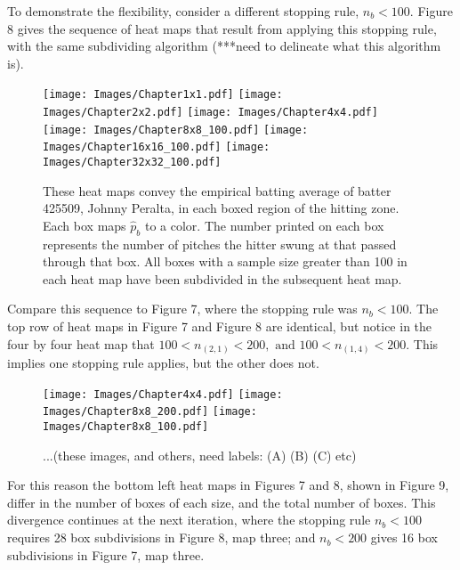 \documentclass{article}
\begin{document}
To demonstrate the flexibility, consider a different stopping rule, $n_{b} < 100$. Figure 8 gives the sequence of heat maps that result from applying this stopping rule, with the same subdividing algorithm (***need to delineate what this algorithm is). 
        \begin{figure}[H]
      	\centering
      	\texttt{[image: Images/Chapter1x1.pdf]}
      	\texttt{[image: Images/Chapter2x2.pdf]}
      	\texttt{[image: Images/Chapter4x4.pdf]}
      	\texttt{[image: Images/Chapter8x8\_100.pdf]}
      	\texttt{[image: Images/Chapter16x16\_100.pdf]}
      	\texttt{[image: Images/Chapter32x32\_100.pdf]}
      	\caption{These heat maps convey the empirical batting average of batter 425509, Johnny Peralta, in each boxed region of the hitting zone. Each box maps $\hat{p}_{b}$ to a color. The number printed on each box represents the number of pitches the hitter swung at that passed through that box. All boxes with a sample size greater than 100 in each heat map have been subdivided in the subsequent heat map.}
\end{figure} 	
Compare this sequence to Figure 7, where the stopping rule was $n_{b} < 100$. The top row of heat maps in Figure 7 and Figure 8 are identical, but notice in the four by four heat map that $100 < n_{(2,1)} < 200, \text{ and } 100 < n_{(1,4)} < 200$. This implies one stopping rule applies, but the other does not.
        \begin{figure}[H]
      	\centering      
      	\texttt{[image: Images/Chapter4x4.pdf]}
      	\texttt{[image: Images/Chapter8x8\_200.pdf]}
      	\texttt{[image: Images/Chapter8x8\_100.pdf]}
      	\caption{...(these images, and others, need labels: (A) (B) (C) etc)}
\end{figure} 
For this reason the bottom left heat maps in Figures 7 and 8, shown in Figure 9, differ in the number of boxes of each size, and the total number of boxes. This divergence continues at the next iteration, where the stopping rule $n_{b} < 100$ requires 28 box subdivisions in Figure 8, map three; and $n_{b} < 200$ gives 16 box subdivisions in Figure 7, map three.


\end{document}
